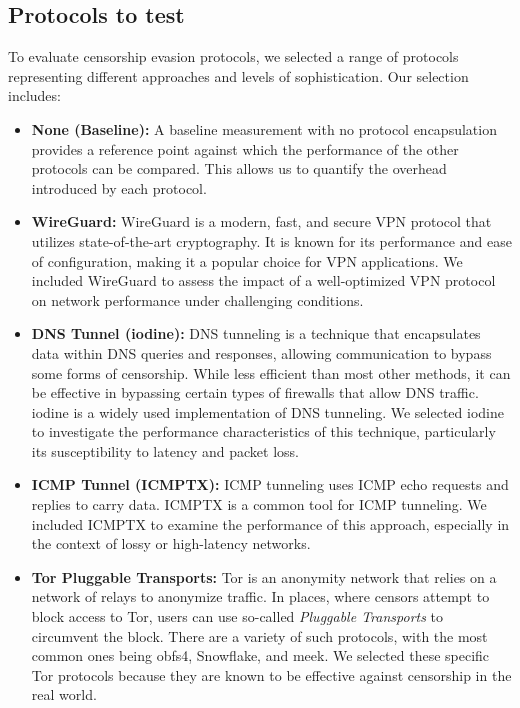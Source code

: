 \subsection{Protocols to test}



To evaluate censorship evasion protocols, we selected a range of protocols representing different approaches and levels of sophistication.
Our selection includes:

\begin{itemize}
  \item \noindent\textbf{None (Baseline):}
    A baseline measurement with no protocol encapsulation provides a reference point against which the performance of the other protocols can be compared.
    This allows us to quantify the overhead introduced by each protocol.

  \item \noindent\textbf{WireGuard:}
    WireGuard is a modern, fast, and secure VPN protocol that utilizes state-of-the-art cryptography.
    It is known for its performance and ease of configuration, making it a popular choice for VPN applications.
    We included WireGuard to assess the impact of a well-optimized VPN protocol on network performance under challenging conditions.

  \item \noindent\textbf{DNS Tunnel (iodine):}
    DNS tunneling is a technique that encapsulates data within DNS queries and responses, allowing communication to bypass some forms of censorship.
    While less efficient than most other methods, it can be effective in bypassing certain types of firewalls that allow DNS traffic.
    iodine is a widely used implementation of DNS tunneling.
    We selected iodine to investigate the performance characteristics of this technique, particularly its susceptibility to latency and packet loss.

  \item \noindent\textbf{ICMP Tunnel (ICMPTX):}
    ICMP tunneling uses ICMP echo requests and replies to carry data.
    ICMPTX is a common tool for ICMP tunneling.
    We included ICMPTX to examine the performance of this approach, especially in the context of lossy or high-latency networks.

  \item \noindent\textbf{Tor Pluggable Transports:}
    Tor is an anonymity network that relies on a network of relays to anonymize traffic.
    In places, where censors attempt to block access to Tor, users can use so-called \textit{Pluggable Transports} to circumvent the block.
    There are a variety of such protocols, with the most common ones being obfs4, Snowflake, and meek.
    We selected these specific Tor protocols because they are known to be effective against censorship in the real world.
\end{itemize}



